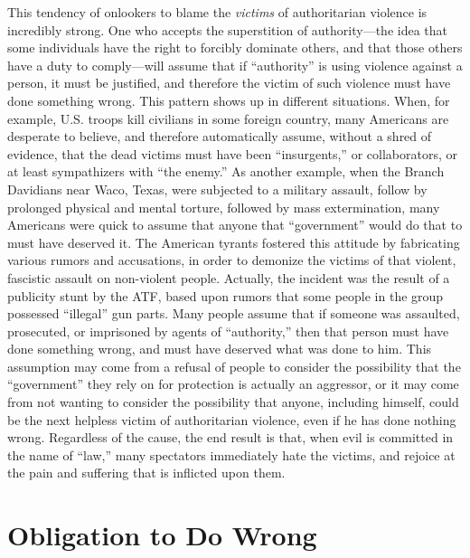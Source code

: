 \documentclass{book}
\begin{document}
This tendency of onlookers to blame the \emph{victims} of authoritarian violence is incredibly strong. One who accepts the superstition of authority---the idea that some individuals have the right to forcibly dominate others, and that those others have a duty to comply---will assume that if \enquote{authority} is using violence against a person, it must be justified, and therefore the victim of such violence must have done something wrong. This pattern shows up in different situations. When, for example, U.S. troops kill civilians in some foreign country, many Americans are desperate to believe, and therefore automatically assume, without a shred of evidence, that the dead victims must have been \enquote{insurgents,} or collaborators, or at least sympathizers with \enquote{the enemy.} As another example, when the Branch Davidians near Waco, Texas, were subjected to a military assault, follow by prolonged physical and mental torture, followed by mass extermination, many Americans were quick to assume that anyone that \enquote{government} would do that to must have deserved it. The American tyrants fostered this attitude by fabricating various rumors and accusations, in order to demonize the victims of that violent, fascistic assault on non-violent people. Actually, the incident was the result of a publicity stunt by the ATF, based upon rumors that some people in the group possessed \enquote{illegal} gun parts. Many people assume that if someone was assaulted, prosecuted, or imprisoned by agents of \enquote{authority,} then that person must have done something wrong, and must have deserved what was done to him. This assumption may come from a refusal of people to consider the possibility that the \enquote{government} they rely on for protection is actually an aggressor, or it may come from not wanting to consider the possibility that anyone, including himself, could be the next helpless victim of authoritarian violence, even if he has done nothing wrong. Regardless of the cause, the end result is that, when evil is committed in the name of \enquote{law,} many spectators immediately hate the victims, and rejoice at the pain and suffering that is inflicted upon them.

\section{Obligation to Do Wrong}
\end{document}
